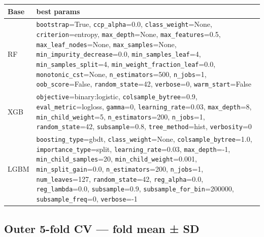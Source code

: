 \documentclass[
  11.5pt,
]{article}
\begin{document}
\begin{longtable}[]{@{}
  >{\raggedright\arraybackslash}p{}
  >{\raggedright\arraybackslash}p{}@{}}
\toprule\noalign{}
\begin{minipage}[b]{\linewidth}\raggedright
Base
\end{minipage} & \begin{minipage}[b]{\linewidth}\raggedright
best params
\end{minipage} \\
\midrule\noalign{}
\endhead
\bottomrule\noalign{}
\endlastfoot
RF & \texttt{bootstrap}=True, \texttt{ccp\_alpha}=0.0,
\texttt{class\_weight}=None, \texttt{criterion}=entropy,
\texttt{max\_depth}=None, \texttt{max\_features}=0.5,
\texttt{max\_leaf\_nodes}=None, \texttt{max\_samples}=None,
\texttt{min\_impurity\_decrease}=0.0, \texttt{min\_samples\_leaf}=4,
\texttt{min\_samples\_split}=4,
\texttt{min\_weight\_fraction\_leaf}=0.0, \texttt{monotonic\_cst}=None,
\texttt{n\_estimators}=500, \texttt{n\_jobs}=1,
\texttt{oob\_score}=False, \texttt{random\_state}=42,
\texttt{verbose}=0, \texttt{warm\_start}=False \\
XGB & \texttt{objective}=binary:logistic,
\texttt{colsample\_bytree}=0.9, \texttt{eval\_metric}=logloss,
\texttt{gamma}=0, \texttt{learning\_rate}=0.03, \texttt{max\_depth}=8,
\texttt{min\_child\_weight}=5, \texttt{n\_estimators}=200,
\texttt{n\_jobs}=1, \texttt{random\_state}=42, \texttt{subsample}=0.8,
\texttt{tree\_method}=hist, \texttt{verbosity}=0 \\
LGBM & \texttt{boosting\_type}=gbdt, \texttt{class\_weight}=None,
\texttt{colsample\_bytree}=1.0, \texttt{importance\_type}=split,
\texttt{learning\_rate}=0.03, \texttt{max\_depth}=-1,
\texttt{min\_child\_samples}=20, \texttt{min\_child\_weight}=0.001,
\texttt{min\_split\_gain}=0.0, \texttt{n\_estimators}=200,
\texttt{n\_jobs}=1, \texttt{num\_leaves}=127, \texttt{random\_state}=42,
\texttt{reg\_alpha}=0.0, \texttt{reg\_lambda}=0.0,
\texttt{subsample}=0.9, \texttt{subsample\_for\_bin}=200000,
\texttt{subsample\_freq}=0, \texttt{verbose}=-1 \\
\end{longtable}

\subsection*{Outer 5-fold CV --- fold mean ±
SD}\label{outer-5-fold-cv-fold-mean-sd}
\end{document}

